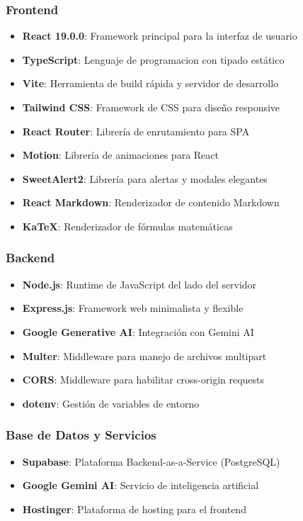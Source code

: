 \documentclass[12pt,a4paper]{report}
\begin{document}
\subsubsection{Frontend}
\begin{itemize}
    \item \textbf{React 19.0.0}: Framework principal para la interfaz de usuario
    \item \textbf{TypeScript}: Lenguaje de programacion con tipado estático
    \item \textbf{Vite}: Herramienta de build rápida y servidor de desarrollo
    \item \textbf{Tailwind CSS}: Framework de CSS para diseño responsive
    \item \textbf{React Router}: Librería de enrutamiento para SPA
    \item \textbf{Motion}: Librería de animaciones para React
    \item \textbf{SweetAlert2}: Librería para alertas y modales elegantes
    \item \textbf{React Markdown}: Renderizador de contenido Markdown
    \item \textbf{KaTeX}: Renderizador de fórmulas matemáticas
\end{itemize}

\subsubsection{Backend}
\begin{itemize}
    \item \textbf{Node.js}: Runtime de JavaScript del lado del servidor
    \item \textbf{Express.js}: Framework web minimalista y flexible
    \item \textbf{Google Generative AI}: Integración con Gemini AI
    \item \textbf{Multer}: Middleware para manejo de archivos multipart
    \item \textbf{CORS}: Middleware para habilitar cross-origin requests
    \item \textbf{dotenv}: Gestión de variables de entorno
\end{itemize}

\subsubsection{Base de Datos y Servicios}
\begin{itemize}
    \item \textbf{Supabase}: Plataforma Backend-as-a-Service (PostgreSQL)
    \item \textbf{Google Gemini AI}: Servicio de inteligencia artificial
    \item \textbf{Hostinger}: Plataforma de hosting para el frontend
\end{itemize}
\end{document}
